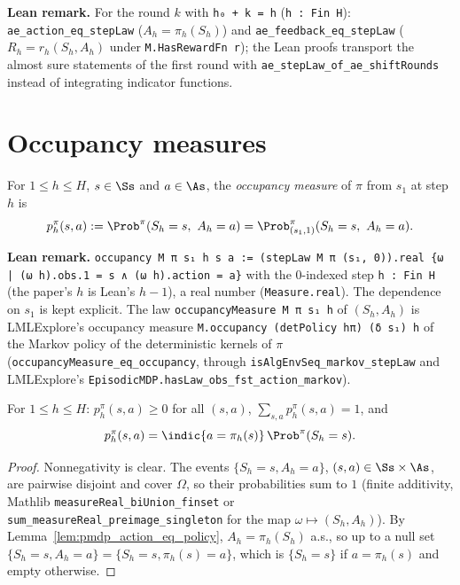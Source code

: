\textbf{Lean remark.} For the round $k$ with \texttt{h₀ + k = h} (\texttt{h : Fin H}):
\texttt{ae\_action\_eq\_stepLaw} ($A_h = \pi_h(S_h)$) and \texttt{ae\_feedback\_eq\_stepLaw}
($R_h = r_h(S_h, A_h)$ under \texttt{M.HasRewardFn r}); the Lean proofs transport the almost sure
statements of the first round with \texttt{ae\_stepLaw\_of\_ae\_shiftRounds} instead of integrating
indicator functions.

\section{Occupancy measures}
\label{sec:pre_mdp_occupancy}

\begin{definition}\label{def:occupancy}
\leanok
{}
For $1 \le h \le H$, $s \in \Ss$ and $a \in \As$, the \emph{occupancy measure} of $\pi$ from
$s_1$ at step $h$ is
\[
  p^\pi_h(s, a) := \Prob^\pi(S_h = s,\ A_h = a) = \Prob^\pi_{(s_1,1)}(S_h = s,\ A_h = a) .
\]
\end{definition}

\textbf{Lean remark.} \texttt{occupancy M π s₁ h s a := (stepLaw M π (s₁, 0)).real \{ω | (ω h).obs.1 = s ∧ (ω h).action = a\}}
with the $0$-indexed step \texttt{h : Fin H} (the paper's $h$ is Lean's $h - 1$), a real number
(\texttt{Measure.real}). The dependence on $s_1$ is kept explicit. The law
\texttt{occupancyMeasure M π s₁ h} of $(S_h, A_h)$ is LMLExplore's occupancy measure
\texttt{M.occupancy (detPolicy hπ) (δ s₁) h} of the Markov policy of the deterministic kernels of
$\pi$ (\texttt{occupancyMeasure\_eq\_occupancy}, through \texttt{isAlgEnvSeq\_markov\_stepLaw} and
LMLExplore's \texttt{EpisodicMDP.hasLaw\_obs\_fst\_action\_markov}).

\begin{lemma}\label{lem:occupancy_sum_one}
\leanok
{}
For $1 \le h \le H$: $p^\pi_h(s,a) \ge 0$ for all $(s, a)$, $\sum_{s,a} p^\pi_h(s,a) = 1$, and
\[
  p^\pi_h(s, a) = \indic\{a = \pi_h(s)\}\,\Prob^\pi(S_h = s) .
\]
\end{lemma}

\begin{proof}
\leanok
Nonnegativity is clear. The events $\{S_h = s, A_h = a\}$, $(s, a) \in \Ss \times \As$, are
pairwise disjoint and cover $\Omega$, so their probabilities sum to $1$ (finite additivity,
Mathlib \texttt{measureReal\_biUnion\_finset} or \texttt{sum\_measureReal\_preimage\_singleton}
for the map $\omega \mapsto (S_h, A_h)$). By Lemma~\ref{lem:pmdp_action_eq_policy},
$A_h = \pi_h(S_h)$ a.s., so up to a null set $\{S_h = s, A_h = a\} = \{S_h = s, \pi_h(s) = a\}$,
which is $\{S_h = s\}$ if $a = \pi_h(s)$ and empty otherwise.
\end{proof}

